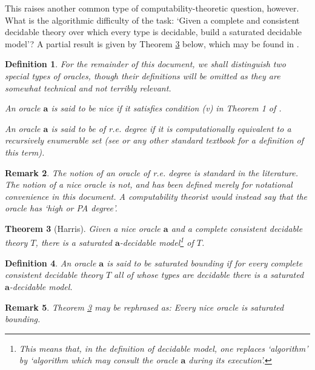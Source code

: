\documentclass{article}
\newtheorem{theorem}{Theorem}[section]
\newtheorem{remark}[theorem]{Remark}
\newtheorem{definition}[theorem]{Definition}
\theoremstyle{nonumberplain}
\begin{document}
This raises another common type of computability-theoretic question, however. What is the algorithmic difficulty of the task: `Given a complete and consistent decidable theory over which every type is decidable, build a saturated decidable model'? A partial result is given by Theorem \ref{thm:sat3} below, which may be found in \cite{ken1}.

\begin{definition}
For the remainder of this document, we shall distinguish two special types of oracles, though their definitions will be omitted as they are somewhat technical and not terribly relevant.

An oracle $\mathbf{a}$ is said to be \emph{nice} if it satisfies condition (v) in Theorem 1 of \cite{jockusch_1972}.

An oracle $\mathbf{a}$ is said to be \emph{of r.e. degree} if it is computationally equivalent to a recursively enumerable set (see \cite{soare1} or any other standard textbook for a definition of this term).
\end{definition}

\begin{remark}
The notion of an oracle of r.e. degree is standard in the literature. The notion of a nice oracle is not, and has been defined merely for notational convenience in this document. A computability theorist would instead say that the oracle has `\emph{high or PA degree}'.
\end{remark}

\begin{theorem}[Harris]\label{thm:sat3}
Given a nice oracle $\mathbf{a}$ and a complete consistent decidable theory $T$, there is a saturated $\mathbf{a}$-decidable model\footnote{This means that, in the definition of decidable model, one replaces `algorithm' by `algorithm which may consult the oracle $\mathbf{a}$ during its execution'.} of $T$.
\end{theorem}

\begin{definition}
An oracle $\mathbf{a}$ is said to be \emph{saturated bounding} if for every complete consistent decidable theory $T$ all of whose types are decidable there is a saturated $\mathbf{a}$-decidable model.
\end{definition}

\begin{remark}
Theorem \ref{thm:sat3} may be rephrased as: Every nice oracle is saturated bounding.
\end{remark}
\end{document}
